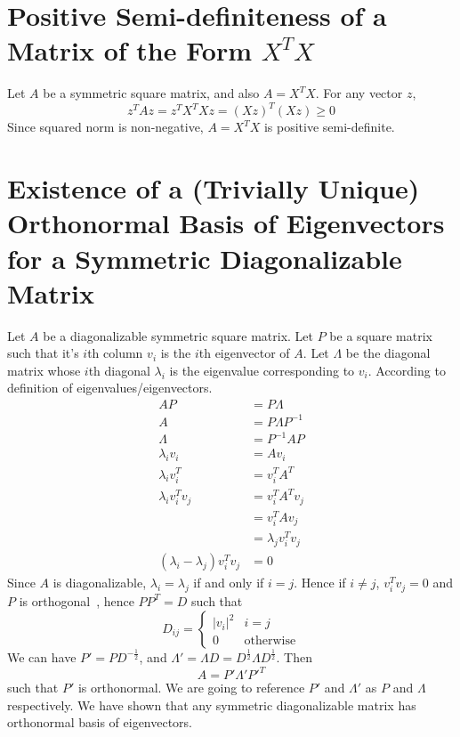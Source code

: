 \documentclass{book}
\numberwithin{equation}{subsection}
\begin{document}
\section{Positive Semi-definiteness of a Matrix of the Form $X^TX$}
Let $A$ be a symmetric square matrix, and also $A=X^TX$. For any vector $z$,
\begin{equation}
z^TAz = z^TX^TXz = (Xz)^T(Xz) \geq 0
\end{equation}
Since squared norm is non-negative, $A=X^TX$ is positive semi-definite.
\section{Existence of a (Trivially Unique) Orthonormal Basis of Eigenvectors for a Symmetric Diagonalizable Matrix}
Let $A$ be a diagonalizable symmetric square matrix. Let $P$ be a square matrix such that it's $i$th column $v_i$ is the $i$th eigenvector of $A$. Let $\Lambda$ be the diagonal matrix whose $i$th diagonal $\lambda_i$ is the eigenvalue corresponding to $v_i$. According to definition of eigenvalues/eigenvectors.
\begin{align}
    AP &= P\Lambda\\
    A &= P\Lambda P^{-1}\\
    \Lambda &= P^{-1}AP\\
    \lambda_iv_i &= Av_i\\
    \lambda_iv_i^T &= v_i^TA^T\\
    \lambda_iv_i^Tv_j &= v_i^TA^Tv_j\\
    &= v_i^TAv_j\\
    &= \lambda_jv_i^Tv_j\\
    (\lambda_i-\lambda_j)v_i^Tv_j &= 0
\end{align}
Since $A$ is diagonalizable, $\lambda_i=\lambda_j$ if and only if $i=j$. Hence if $i \neq j$, $v_i^Tv_j = 0$ and $P$ is orthogonal~\cite{magidin_linear_2011}, hence
$PP^T = D$ such that
\begin{equation}
D_{ij} = \begin{cases}
    |v_i|^2 & i = j\\
    0 & \text{otherwise}
\end{cases}
\end{equation}
We can have $P' = PD^{-\frac{1}{2}}$, and $\Lambda' = \Lambda D = D^{\frac{1}{2}} \Lambda D^{\frac{1}{2}}$. Then
\begin{equation}
    A = P'\Lambda'P'^T
\end{equation}
such that $P'$ is orthonormal. We are going to reference $P'$ and $\Lambda'$ as $P$ and $\Lambda$ respectively. We have shown that any symmetric diagonalizable matrix has orthonormal basis of eigenvectors.
\end{document}
